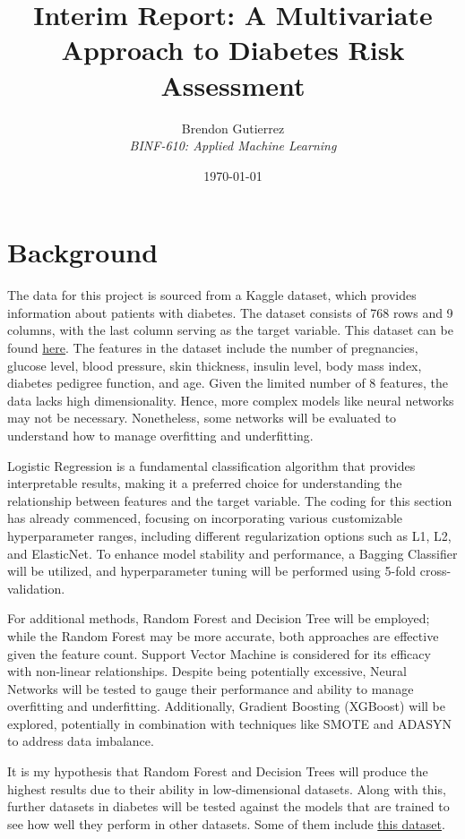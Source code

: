 \documentclass[12pt,a4paper]{article}
\title{Interim Report: A Multivariate Approach to Diabetes Risk Assessment}
\author{Brendon Gutierrez \\ \textit{BINF-610: Applied Machine Learning}}
\date{\today}
\begin{document}
	\maketitle
	
	\newpage
	\onehalfspacing
	\section{Background}
	The data for this project is sourced from a Kaggle dataset, which provides information about patients with diabetes. The dataset consists of 768 rows and 9 columns, with the last column serving as the target variable. This dataset can be found \href{https://www.kaggle.com/datasets/akshaydattatraykhare/diabetes-dataset}{here}. The features in the dataset include the number of pregnancies, glucose level, blood pressure, skin thickness, insulin level, body mass index, diabetes pedigree function, and age. Given the limited number of 8 features, the data lacks high dimensionality. Hence, more complex models like neural networks may not be necessary. Nonetheless, some networks will be evaluated to understand how to manage overfitting and underfitting.
	\par 
	Logistic Regression is a fundamental classification algorithm that provides interpretable results, making it a preferred choice for understanding the relationship between features and the target variable. The coding for this section has already commenced, focusing on incorporating various customizable hyperparameter ranges, including different regularization options such as L1, L2, and ElasticNet. To enhance model stability and performance, a Bagging Classifier will be utilized, and hyperparameter tuning will be performed using 5-fold cross-validation.
	\par
	For additional methods, Random Forest and Decision Tree will be employed; while the Random Forest may be more accurate, both approaches are effective given the feature count. Support Vector Machine is considered for its efficacy with non-linear relationships. Despite being potentially excessive, Neural Networks will be tested to gauge their performance and ability to manage overfitting and underfitting. Additionally, Gradient Boosting (XGBoost) will be explored, potentially in combination with techniques like SMOTE and ADASYN to address data imbalance.
	\par
	It is my hypothesis that Random Forest and Decision Trees will produce the highest results due to their ability in low-dimensional datasets. Along with this, further datasets in diabetes will be tested against the models that are trained to see how well they perform in other datasets. Some of them include \href{https://www.kaggle.com/datasets/ehababoelnaga/diabetes-dataset}{this dataset}.
\end{document}
